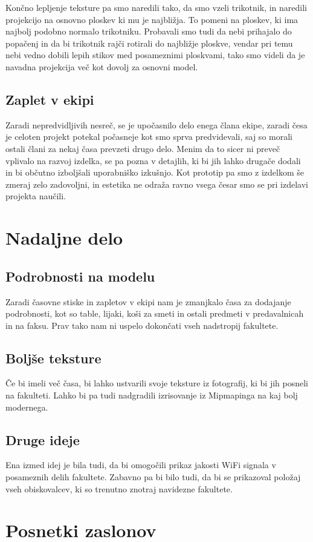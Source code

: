 \documentclass[10pt,a4paper]{article}
\begin{document}
Končno lepljenje teksture pa smo naredili tako, da smo vzeli trikotnik, in naredili projekcijo na osnovno ploskev ki mu je najbližja. To pomeni na ploskev, ki ima najbolj podobno normalo trikotniku. Probavali smo tudi da nebi prihajalo do popačenj in da bi trikotnik rajči rotirali do najbližje ploskve, vendar pri temu nebi vedno dobili lepih stikov med posameznimi ploskvami, tako smo videli da je navadna projekcija več kot dovolj za osnovni model.  

\subsection{Zaplet v ekipi}
Zaradi nepredvidljivih nesreč, se je upočasnilo delo enega člana ekipe, zaradi česa je celoten projekt potekal počasneje kot smo sprva predvidevali, saj so morali ostali člani za nekaj časa prevzeti drugo delo. Menim da to sicer ni preveč vplivalo na razvoj izdelka, se pa pozna v detajlih, ki bi jih lahko drugače dodali in bi občutno izboljšali uporabniško izkušnjo. Kot prototip pa smo z izdelkom še zmeraj zelo zadovoljni, in estetika ne odraža ravno vsega česar smo se pri izdelavi projekta naučili.
\pagebreak
\section{Nadaljne delo}
\subsection{Podrobnosti na modelu}
Zaradi časovne stiske in zapletov v ekipi nam je zmanjkalo časa za dodajanje podrobnosti, kot so 
table, lijaki, koši za smeti in ostali predmeti v predavalnicah in na faksu. Prav
tako nam ni uspelo dokončati vseh nadstropij fakultete. 
\subsection{Boljše teksture}
Če bi imeli več časa, bi lahko ustvarili svoje teksture iz fotografij, ki bi 
jih posneli na fakulteti. Lahko bi pa tudi nadgradili izrisovanje iz Mipmapinga
na kaj bolj modernega. 
\subsection{Druge ideje}
Ena izmed idej je bila tudi, da bi omogočili prikaz jakosti WiFi signala v posameznih delih 
fakultete. Zabavno pa bi bilo tudi, da bi se prikazoval položaj vseh obiskovalcev, ki so trenutno
znotraj navidezne fakultete.
\pagebreak
\section{Posnetki zaslonov}
\end{document}
